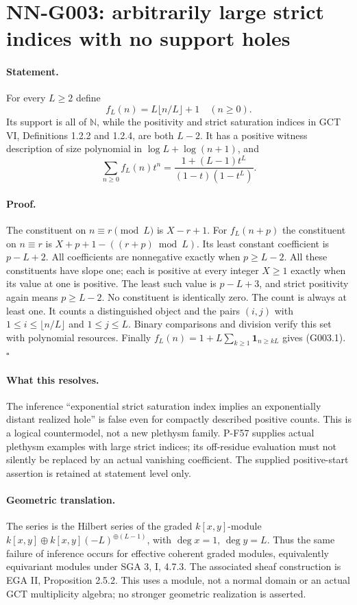 \section{NN-G003: arbitrarily large strict indices with no support holes}
\paragraph{Statement.}
For every $L\ge2$ define
\[
 f_L(n)=L\lfloor n/L\rfloor+1\quad(n\ge0).
\]
Its support is all of $\mathbb N$, while the positivity and strict
saturation indices in GCT VI, Definitions 1.2.2 and 1.2.4, are both
$L-2$. It has a positive witness description of size polynomial in
$\log L+\log(n+1)$, and
\[
 \sum_{n\ge0}f_L(n)t^n=
 \frac{1+(L-1)t^L}{(1-t)(1-t^L)}.
 \tag{G003.1}
\]

\paragraph{Proof.}
The constituent on $n\equiv r\pmod L$ is $X-r+1$.
For $f_L(n+p)$ the constituent on $n\equiv r$ is
$X+p+1-((r+p)\bmod L)$. Its least constant coefficient is
$p-L+2$. All coefficients are nonnegative exactly when $p\ge L-2$.
All these constituents have slope one; each is positive at every
integer $X\ge1$ exactly when its value at one is positive. The least
such value is $p-L+3$, and strict positivity again means
$p\ge L-2$. No constituent is identically zero. The count is always
at least one. It counts a distinguished object and the pairs
$(i,j)$ with $1\le i\le\lfloor n/L\rfloor$ and $1\le j\le L$.
Binary comparisons and division verify this set with polynomial
resources. Finally
$f_L(n)=1+L\sum_{k\ge1}\mathbf1_{n\ge kL}$ gives (G003.1).
\hfill$\square$

\paragraph{What this resolves.}
The inference ``exponential strict saturation index implies an
exponentially distant realized hole'' is false even for compactly
described positive counts. This is a logical countermodel, not a
new plethysm family. P-F57 supplies actual plethysm examples with
large strict indices; its off-residue evaluation must not silently
be replaced by an actual vanishing coefficient. The supplied
positive-start assertion is retained at statement level only.

\paragraph{Geometric translation.}
The series is the Hilbert series of the graded
$k[x,y]$-module
$k[x,y]\oplus k[x,y](-L)^{\oplus(L-1)}$, with
$\deg x=1$, $\deg y=L$. Thus the same failure of inference occurs
for effective coherent graded modules, equivalently equivariant
modules under SGA 3, I, 4.7.3. The associated sheaf construction is
EGA II, Proposition 2.5.2. This uses a module, not a normal domain
or an actual GCT multiplicity algebra; no stronger geometric
realization is asserted.



